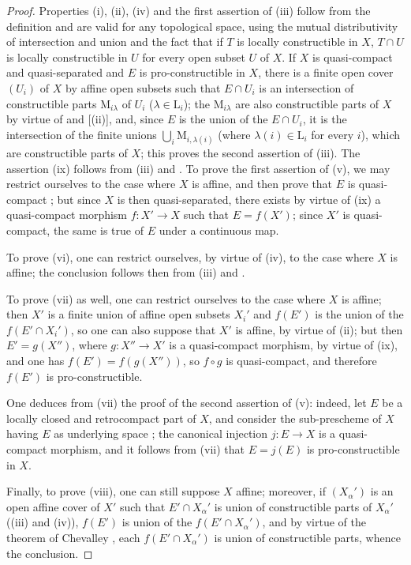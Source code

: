 \begin{proof}
Properties (i), (ii), (iv) and the first assertion of (iii) follow from the definition  and are valid for any topological space, using the mutual distributivity of intersection and union and the fact that if $T$ is locally constructible in $X$, $T\cap U$ is locally constructible in $U$ for every open subset $U$ of $X$.
If $X$ is quasi-compact and quasi-separated and $E$ is pro-constructible in $X$, there is a finite open cover $(U_i)$ of $X$ by affine open subsets such that $E\cap U_i$ is an intersection of constructible parts $\mathrm{M}_{i\lambda}$ of $U_i$ ($\lambda\in\mathrm{L}_i$); the $\mathrm{M}_{i\lambda}$ are also constructible parts of $X$ by virtue of  and [(ii)], and, since $E$ is the union of the $E\cap U_i$, it is the intersection of the finite unions $\bigcup_i \mathrm{M}_{i,\lambda(i)}$ (where $\lambda(i)\in\mathrm{L}_i$ for every $i$), which are constructible parts of $X$; this proves the second assertion of (iii).
The assertion (ix) follows from (iii) and .
To prove the first assertion of (v), we may restrict ourselves to the case where $X$ is affine, and then prove that $E$ is quasi-compact ; but since $X$ is then quasi-separated, there exists by virtue of (ix) a quasi-compact morphism $f:X'\to X$ such that $E=f(X')$; since $X'$ is quasi-compact, the same is true of $E$ under a continuous map.

To prove (vi), one can restrict ourselves, by virtue of (iv), to the case where $X$ is affine; the conclusion follows then from (iii) and .

To prove (vii) as well, one can restrict ourselves to the case where $X$ is affine; then $X'$ is a finite union of affine open subsets $X_i'$ and $f(E')$ is the union of the $f(E'\cap X_i')$, so one can also suppose that $X'$ is affine, by virtue of (ii); but then $E'=g(X'')$, where $g:X''\to X'$ is a quasi-compact morphism, by virtue of (ix), and one has $f(E')=f(g(X''))$, so $f\circ g$ is quasi-compact, and therefore $f(E')$ is pro-constructible.

One deduces from (vii) the proof of the second assertion of (v): indeed, let $E$ be a locally closed and retrocompact part of $X$, and consider the sub-prescheme of $X$ having $E$ as underlying space ; the canonical injection $j:E\to X$ is a quasi-compact morphism, and it follows from (vii) that $E=j(E)$ is pro-constructible in $X$.

Finally, to prove (viii), one can still suppose $X$ affine; moreover, if $(X_\alpha')$ is an open affine cover of $X'$ such that $E'\cap X_\alpha'$ is union of constructible parts of $X_\alpha'$ ((iii) and (iv)), $f(E')$ is union of the $f(E'\cap X_\alpha')$, and by virtue of the theorem of Chevalley , each $f(E'\cap X_\alpha')$ is union of constructible parts, whence the conclusion.
\end{proof}

